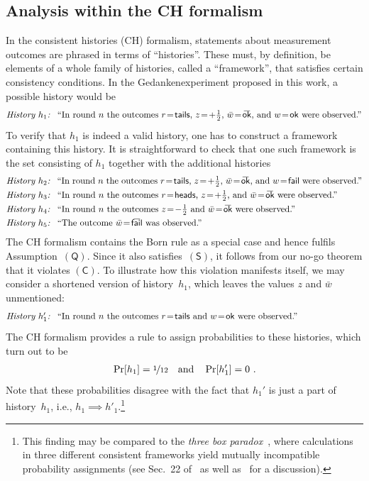 \documentclass{article}
\theoremstyle{mystyle}
\theoremstyle{definition}
\newcommand{\oline}[2]{{\mkern#2mu\overline{\protect\vphantom{t}\mkern-#2mu\smash{#1}\mkern-#2mu}\mkern#2mu}}
\newcommand*{\wb}{\bar{w}}
\newcommand*{\sminus}{{\textstyle - \frac{1}{2}}}
\newcommand*{\splus}{{\textstyle + \frac{1}{2}}}
\newcommand*{\QT}{\mathsf{(Q)}}
\newcommand*{\SW}{\mathsf{(S)}}
\newcommand*{\SelfCons}{\mathsf{(C)}}
\newcommand*{\ok}{\mathsf{ok}}
\newcommand*{\fail}{\mathsf{fail}}
\newcommand*{\okb}{\oline{\ok}{2.8}}
\newcommand*{\failb}{\oline{\fail}{5}}
\newcommand*{\head}{\mathsf{heads}}
\newcommand*{\tail}{\mathsf{tails}}
\newcommand*{\asn}[1]{``#1''}
\newcommand*{\hT}[1]{{\text{\emph{History $#1$: }}}}
\newcommand*{\sTM}[1]{\begin{minipage}{14cm} \hangindent=8.6em  #1 \end{minipage}}
\begin{document}
\subsection{Analysis within the CH formalism} \label{app_conshistories}

In the consistent histories (CH) formalism, statements about measurement outcomes are phrased in terms of ``histories''. These must, by definition, be elements of a whole family of histories, called a ``framework'', that satisfies certain consistency conditions.  In the Gedankenexperiment proposed in this work, a possible history would be
\begin{align*} 
  \sTM{\hT{h_1} \asn{In round~$n$ the outcomes $r \!=\!\tail$, $z\!=\!\splus$, $\wb\!=\!\okb$, and $w\!=\!\ok$ were observed.}}
\end{align*}
To verify that $h_1$ is indeed a valid history, one has to construct a framework containing this history. It is straightforward to check that one such framework is the set consisting of $h_1$  together with the additional histories
\begin{align*}
 \sTM{\hT{h_2} \asn{In round~$n$ the outcomes $r \!=\!\tail$, $z\!=\!\splus$, $\wb\!=\!\okb$, and $w\!=\!\fail$ were observed.}} \\
  \sTM{\hT{h_3} \asn{In round~$n$ the outcomes $r \!=\!\head$, $z\!=\!\splus$, and $\wb\!=\!\okb$ were observed.}} \\
   \sTM{\hT{h_4} \asn{In round~$n$ the outcomes $z\!=\!\sminus$ and $\wb\!=\!\okb$ were observed.}} \\
   \sTM{\hT{h_5} \asn{The outcome $\wb\!=\!\failb$ was observed.}}
\end{align*}
The CH formalism contains the Born rule as a special case and hence fulfils Assumption~$\QT$. Since it also satisfies~$\SW$, it follows from our no-go theorem that it violates $\SelfCons$. To illustrate how this violation manifests itself, we may consider a shortened version of history~$h_1$, which leaves the values $z$ and $\wb$ unmentioned:
 \begin{align*}
    \sTM{\hT{h_1' }  \asn{In round~$n$ the outcomes $r \!=\!\tail$ and  $w\!=\!\ok$ were observed.}}
 \end{align*}
The CH formalism provides a rule to assign probabilities to these histories, which turn out to be  
 \begin{align} \label{eq_probass}
  \Pr[h_1] = \nicefrac{1}{12} \quad \text{and} \quad  \Pr[h_1'] = 0 \ .
\end{align}
Note that these probabilities disagree with the fact that $h_1'$ is  just a part of history~$h_1$, i.e., $h_1 \implies h'_1$.\footnote{This finding may be compared to the  \emph{three box paradox}~\cite{AhaVai91}, where calculations in three different consistent frameworks yield mutually incompatible probability assignments (see Sec.~22 of~\cite{Griffiths02} as well as~\cite{Kent97} for a discussion).}
\end{document}
